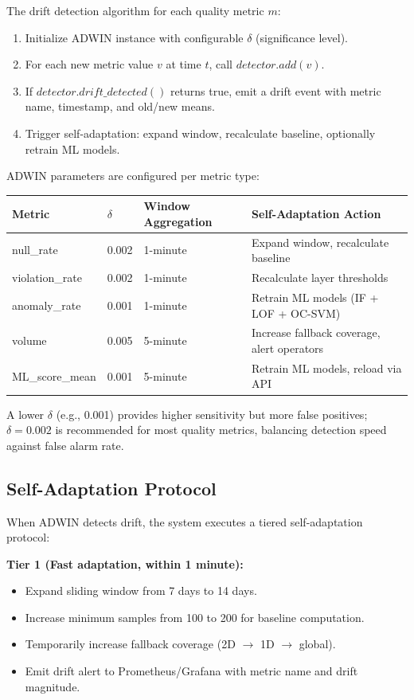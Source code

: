 The drift detection algorithm for each quality metric $m$:

\begin{enumerate}
    \item Initialize ADWIN instance with configurable $\delta$ (significance level).
    \item For each new metric value $v$ at time $t$, call $detector.add(v)$.
    \item If $detector.drift\_detected()$ returns true, emit a drift event with metric name, timestamp, and old/new means.
    \item Trigger self-adaptation: expand window, recalculate baseline, optionally retrain ML models.
\end{enumerate}

ADWIN parameters are configured per metric type:

\begin{longtable}{|m{4cm}|m{3cm}|m{3cm}|m{4cm}|}
\hline
\textbf{Metric} & \textbf{$\delta$} & \textbf{Window Aggregation} & \textbf{Self-Adaptation Action} \\ \hline
null\_rate & 0.002 & 1-minute & Expand window, recalculate baseline \\ \hline
violation\_rate & 0.002 & 1-minute & Recalculate layer thresholds \\ \hline
anomaly\_rate & 0.001 & 1-minute & Retrain ML models (IF + LOF + OC-SVM) \\ \hline
volume & 0.005 & 5-minute & Increase fallback coverage, alert operators \\ \hline
ML\_score\_mean & 0.001 & 5-minute & Retrain ML models, reload via API \\ \hline
\end{longtable}

A lower $\delta$ (e.g., 0.001) provides higher sensitivity but more false positives; $\delta=0.002$ is recommended for most quality metrics, balancing detection speed against false alarm rate.

\subsection{Self-Adaptation Protocol}

When ADWIN detects drift, the system executes a tiered self-adaptation protocol:

\textbf{Tier 1 (Fast adaptation, within 1 minute):}
\begin{itemize}
    \item Expand sliding window from 7 days to 14 days.
    \item Increase minimum samples from 100 to 200 for baseline computation.
    \item Temporarily increase fallback coverage (2D $\to$ 1D $\to$ global).
    \item Emit drift alert to Prometheus/Grafana with metric name and drift magnitude.
\end{itemize}


